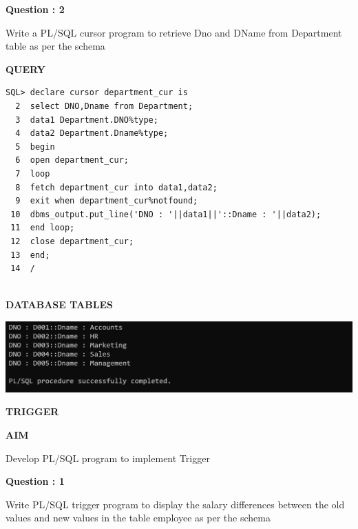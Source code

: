 \documentclass[a4paper,12pt]{report}
\begin{document}
\begin{flushleft}
    \textbf{Question : 2}
\end{flushleft}
Write a PL/SQL cursor program to retrieve Dno and DName from Department table as per the schema
\begin{flushleft}
\textbf{QUERY }
\end{flushleft}
 \begin{verbatim}
SQL> declare cursor department_cur is
  2  select DNO,Dname from Department;
  3  data1 Department.DNO%type;
  4  data2 Department.Dname%type;
  5  begin
  6  open department_cur;
  7  loop
  8  fetch department_cur into data1,data2;
  9  exit when department_cur%notfound;
 10  dbms_output.put_line('DNO : '||data1||'::Dname : '||data2);
 11  end loop;
 12  close department_cur;
 13  end;
 14  /


\end{verbatim}
\begin{flushleft}
\textbf{DATABASE TABLES}
\end{flushleft}
\includegraphics[scale=0.45]{C2.png}
\newpage
\begin{center}
\large\textbf{TRIGGER}
\end{center}

\begin{flushleft}
\textbf{AIM }
\end{flushleft}
Develop PL/SQL program to implement Trigger

\begin{flushleft}
    \textbf{Question : 1}
\end{flushleft}
Write PL/SQL trigger program to display the salary differences between the old values and new values in the table employee as per the schema
\end{document}
